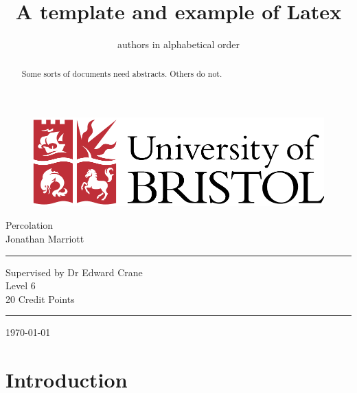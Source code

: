 \documentclass[a4paper,11pt]{article}
\theoremstyle{definition}
\begin{document}
\thispagestyle{empty}

\begin{figure}[h]
\begin{center}
\includegraphics[scale=0.5]{uob.pdf} %
\end{center}
\end{figure}

\begin{center}
{\Large Percolation\\ \vspace{1cm}Jonathan Marriott}
\end{center}

\vspace{3cm}
\hrule
\begin{center}
Supervised by Dr Edward Crane\\
Level 6\\
20 Credit Points
\end{center}
\hrule

\vspace{3cm}
\begin{center}
\today
\end{center}
	
\title{A template and example of Latex}
\author{authors in alphabetical order}
\date{}
\maketitle

\begin{abstract}
Some sorts of documents need abstracts. Others do not.
\end{abstract}



\section{Introduction}
\end{document}
